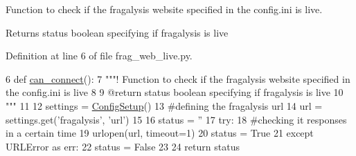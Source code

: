 Function to check if the fragalysis website specified in the config.\+ini is live. 

\begin{DoxyReturn}{Returns}
status boolean specifying if fragalysis is live 
\end{DoxyReturn}


Definition at line 6 of file frag\+\_\+web\+\_\+live.\+py.


\begin{DoxyCode}
6 \textcolor{keyword}{def }\hyperlink{namespacefragalysis__api_1_1xcextracter_1_1frag__web__live_a0c358bb08db16e67b947ea3e06a2516c}{can\_connect}():
7     \textcolor{stringliteral}{"""! Function to check if the fragalysis website specified in the config.ini is live}
8 \textcolor{stringliteral}{}
9 \textcolor{stringliteral}{    @return status boolean specifying if fragalysis is live}
10 \textcolor{stringliteral}{    """}
11 
12     settings = \hyperlink{namespacefragalysis__api_1_1xcglobalscripts_1_1set__config_a9b5445f82604ad45c1e85e2b07e4a317}{ConfigSetup}()
13     \textcolor{comment}{#defining the fragalysis url}
14     url = settings.get(\textcolor{stringliteral}{'fragalysis'}, \textcolor{stringliteral}{'url'})
15 
16     status = \textcolor{stringliteral}{''}
17     \textcolor{keywordflow}{try}:
18         \textcolor{comment}{#checking it responses in a certain time}
19         urlopen(url, timeout=1)
20         status = \textcolor{keyword}{True}
21     \textcolor{keywordflow}{except} URLError \textcolor{keyword}{as} err:
22         status = \textcolor{keyword}{False}
23 
24     \textcolor{keywordflow}{return} status
\end{DoxyCode}
